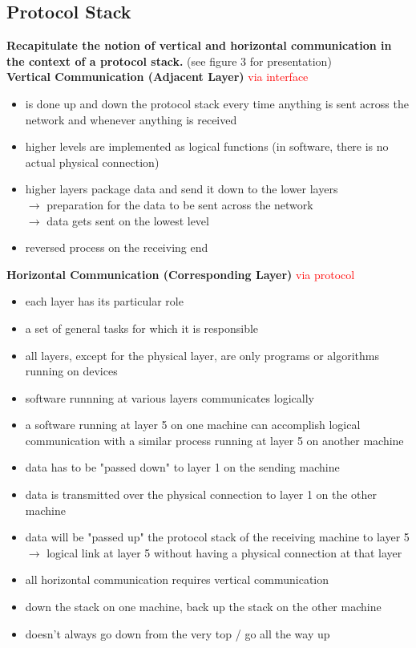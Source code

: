 \documentclass[a4paper,12pt]{article}
\begin{document}
\subsection{Protocol Stack}
	\textbf{Recapitulate the notion of vertical and horizontal communication in the context of a protocol stack.} (see figure 3 for presentation)\\
	
	\textbf{Vertical Communication (Adjacent Layer)}
	\textcolor{red}{via interface}
	\begin{itemize}[itemsep=0pt]
		\item  is done up and down the protocol stack every time anything is sent across the network and whenever anything is received
		\item  higher levels are implemented as logical functions (in software, there is no actual physical connection)
		\item  higher layers package data and send it down to the lower layers \\
		$\rightarrow$ preparation for the data to be sent across the network \\
		$\rightarrow$ data gets sent on the lowest level
		\item  reversed process on the receiving end
	\end{itemize}
	
	\textbf{Horizontal Communication (Corresponding Layer)}
	\textcolor{red}{via protocol}
	\begin{itemize}[itemsep=0pt]
		\item  each layer has its particular role \item  a set of general tasks for which it is responsible
		\item  all layers, except for the physical layer, are only programs or algorithms running on devices
		\item  software runnning at various layers communicates logically
		\item  a software running at layer 5 on one machine can accomplish logical communication with a similar process running at layer 5 on another machine
		\item  data has to be "passed down" to layer 1 on the sending machine
		\item  data is transmitted over the physical connection to layer 1 on the other machine
		\item  data will be "passed up" the protocol stack of the receiving machine to layer 5 \\
		$\rightarrow$ logical link at layer 5 without having a physical connection at that layer
		\item  all horizontal communication requires vertical communication
		\item  down the stack on one machine, back up the stack on the other machine
		\item  doesn't always go down from the very top / go all the way up
	\end{itemize}
	
\end{document}
